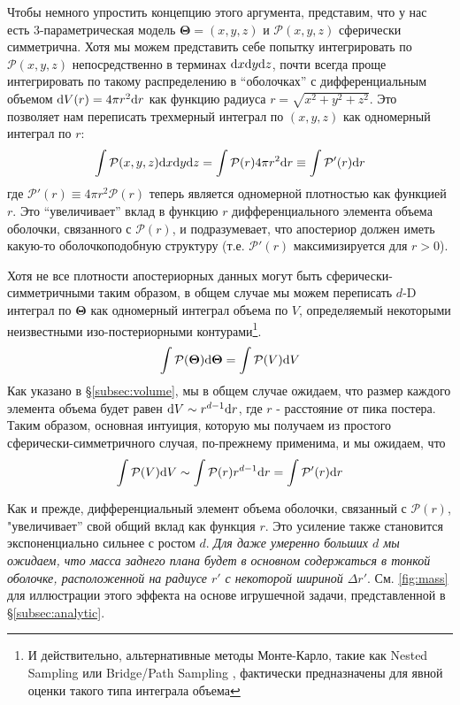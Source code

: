 \documentclass[12pt, titlepage]{article}
\newcommand{\deriv}{\ensuremath{{\rm d}}}  %
\newcommand{\params}{\ensuremath{\boldsymbol\Theta}}
\newcommand{\posterior}{\ensuremath{\mathcal{P}}}
\begin{document}
Чтобы немного упростить концепцию этого аргумента, представим, что у нас есть 3-параметрическая модель $\params = (x, y, z)$ и $\posterior(x,y,z)$ сферически симметрична. Хотя мы можем представить себе попытку интегрировать по $\posterior(x,y,z)$ непосредственно в терминах $\deriv x \deriv y \deriv z$, почти всегда проще интегрировать по такому распределению в ``оболочках'' с дифференциальным объемом $\deriv V(r) = 4 \pi r^2 \deriv r$ как функцию радиуса $r = \sqrt{x^2 + y^2 + z^2}$. Это позволяет нам переписать трехмерный интеграл по $(x,y,z)$ как одномерный интеграл по $r$:
\begin{equation}
    \int \posterior(x,y,z) \deriv x \deriv y \deriv z
    = \int \posterior(r) 4 \pi r^2 \deriv r
    \equiv \int \posterior'(r) \deriv r
\end{equation}
где $\posterior'(r)\equiv 4 \pi r^2 \posterior(r)$ теперь является одномерной плотностью как функцией $r$. Это ``увеличивает'' вклад в функцию $r$ дифференциального элемента объема оболочки, связанного с $\posterior(r)$, и подразумевает, что апостериор должен иметь какую-то оболочкоподобную структуру (т.е. $\posterior'(r)$ максимизируется для $r > 0$).

Хотя не все плотности апостериорных данных могут быть сферически-симметричными таким образом, в общем случае мы можем переписать $d$-D интеграл по $\params$ как одномерный интеграл объема по $V$, определяемый некоторыми неизвестными изо-постериорными контурами\footnote{И действительно, альтернативные методы Монте-Карло, такие как Nested Sampling \citep{skilling04,skilling06} или Bridge/Path Sampling \citep{gelmanmeng98}, фактически предназначены для явной оценки такого типа интеграла объема}.
\begin{equation}
    \int \posterior(\params) \deriv \params
    = \int \posterior(V) \deriv V
\end{equation}
Как указано в \S\ref{subsec:volume}, мы в общем случае ожидаем, что размер каждого элемента объема будет равен $\deriv V \sim r^{d-1} \deriv r$, где $r$ - расстояние от пика постера. Таким образом, основная интуиция, которую мы получаем из простого сферически-симметричного случая, по-прежнему применима, и мы ожидаем, что
\begin{equation}
    \int \posterior(V) \deriv V 
    \sim \int \posterior(r) r^{d-1} \deriv r
    = \int \posterior'(r) \deriv r
\end{equation}

Как и прежде, дифференциальный элемент объема оболочки, связанный с $\posterior(r)$, "увеличивает'' свой общий вклад как функция $r$. Это усиление также становится экспоненциально сильнее с ростом $d$. \textit{Для даже умеренно больших $d$ мы ожидаем, что масса заднего плана будет в основном содержаться в тонкой оболочке, расположенной на радиусе $r'$ с некоторой шириной $\Delta r'$}. См. {\color{red} \autoref{fig:mass}} для иллюстрации этого эффекта на основе игрушечной задачи, представленной в \S\ref{subsec:analytic}.
\end{document}
